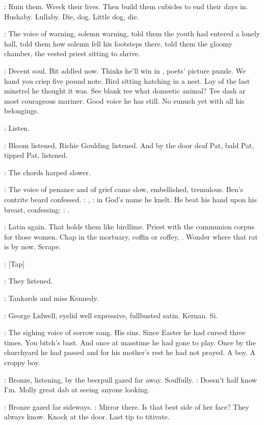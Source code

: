 \BloomInt:
Ruin them.
Wreck their lives.
Then build them cubicles to end their
days in.
Hushaby.
Lullaby.
Die,
dog.
Little dog,
die.

:
The voice of warning,
solemn warning,
told them the youth had
entered a lonely hall,
told them how solemn fell his footsteps there,
told
them the gloomy chamber,
the vested priest sitting to shrive.

\BloomInt:
Decent soul.
Bit addled now.
Thinks he'll win in
,
poets' picture puzzle.
We hand you crisp five pound note.
Bird sitting hatching
in a nest.
Lay of the last minstrel he thought it was.
See blank tee what
domestic animal?
Tee dash ar most courageous mariner.
Good voice he has
still.
No eunuch yet with all his belongings.

\BloomInt:
Listen.

:
Bloom listened.
Richie Goulding listened.
And by the door
deaf Pat,
bald Pat,
tipped Pat,
listened.

:
The chords harped slower.

:
The voice of penance and of grief came slow,
embellished,
tremulous.
Ben's contrite beard confessed.
\dollard:
,
:
in God's name he knelt.
He beat his hand upon his breast,
confessing:
\dollard:
.

\BloomInt:
Latin again.
That holds them like birdlime.
Priest with the
communion corpus for those women.
Chap in the mortuary,
coffin or
coffey,
.
Wonder where that rat is by now.
Scrape.

\stripling:
[Tap]

:
They listened.

:
Tankards and miss Kennedy.

:
George Lidwell,
eyelid
well expressive,
fullbusted satin.
Kernan.
Si.

:
The sighing voice of sorrow sang.
His sins.
Since Easter he had
cursed three times.
You bitch's bast.
And once at masstime he had gone to
play.
Once by the churchyard he had passed and for his mother's rest he
had not prayed.
A boy.
A croppy boy.

:
Bronze,
listening,
by the beerpull gazed far away.
Soulfully.
\BloomInt:
Doesn't half know I'm.
Molly great dab at seeing anyone looking.

:
Bronze gazed far sideways.
\BloomInt:
Mirror there.
Is that best side of her face?
They always know.
Knock at the door.
Last tip to titivate.

